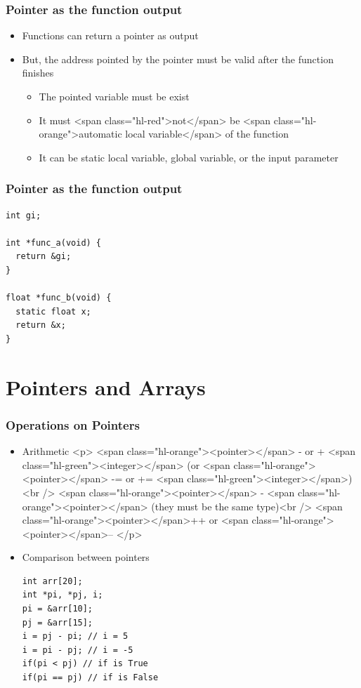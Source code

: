 \documentclass{../c-lecture}
\begin{document}
\begin{frame}
  \frametitle{Pointer as the function output}
  \begin{itemize}
    \item Functions can return a pointer as output
    \item
      But, the address pointed by the pointer must be valid after the function
      finishes

    \begin{itemize}
      \item The pointed variable must be exist
      \item
        It must <span class="hl-red">not</span> be
        <span class="hl-orange">automatic local variable</span> of the function

      \item
        It can be static local variable, global variable, or the input parameter

    \end{itemize}
  \end{itemize}
\end{frame}

\begin{frame}[fragile]
  \frametitle{Pointer as the function output}
  \begin{verbatim}
int gi;

int *func_a(void) {
  return &gi;
}

float *func_b(void) {
  static float x;
  return &x;
}
  \end{verbatim}
\end{frame}

\section{Pointers and Arrays}

\begin{frame}[fragile]
  \frametitle{Operations on Pointers}
  \begin{itemize}
    \item Arithmetic
    <p>
      <span class="hl-orange"><pointer></span> - or +
      <span class="hl-green"><integer></span> (or
      <span class="hl-orange"><pointer></span> -= or +=
      <span class="hl-green"><integer></span>)<br />
      <span class="hl-orange"><pointer></span> -
      <span class="hl-orange"><pointer></span> (they must be the same
      type)<br />
      <span class="hl-orange"><pointer></span>++ or
      <span class="hl-orange"><pointer></span>--
    </p>
    \item Comparison between pointers
    \begin{verbatim}
int arr[20];
int *pi, *pj, i;
pi = &arr[10];
pj = &arr[15];
i = pj - pi; // i = 5
i = pi - pj; // i = -5
if(pi < pj) // if is True
if(pi == pj) // if is False
    \end{verbatim}
  \end{itemize}
\end{frame}
\end{document}
